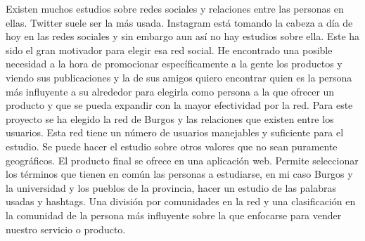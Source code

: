 
Existen muchos estudios sobre redes sociales y relaciones entre las personas en ellas. Twitter suele ser la más usada. Instagram está tomando la cabeza a día de hoy en las redes sociales y sin embargo aun así no hay estudios sobre ella.
Este ha sido el gran motivador para elegir esa red social. He encontrado una posible necesidad a la hora de promocionar específicamente a la gente los productos y viendo sus publicaciones y la de sus amigos quiero encontrar quien es la persona más influyente a su alrededor para elegirla como persona a la que ofrecer un producto y que se pueda expandir con la mayor efectividad por la red.
Para este proyecto se ha elegido la red de Burgos y las relaciones que existen entre los usuarios. Esta red tiene un número de usuarios manejables y suficiente para el estudio. Se puede hacer el estudio sobre otros valores que no sean puramente geográficos.
El producto final se ofrece en una aplicación web. Permite seleccionar los términos que tienen en común las personas a estudiarse, en mi caso Burgos y la universidad y los pueblos de la provincia, hacer un estudio de las palabras usadas y hashtags. Una división por comunidades en la red y una clasificación en la comunidad de la persona más influyente sobre la que enfocarse para vender nuestro servicio o producto. 
